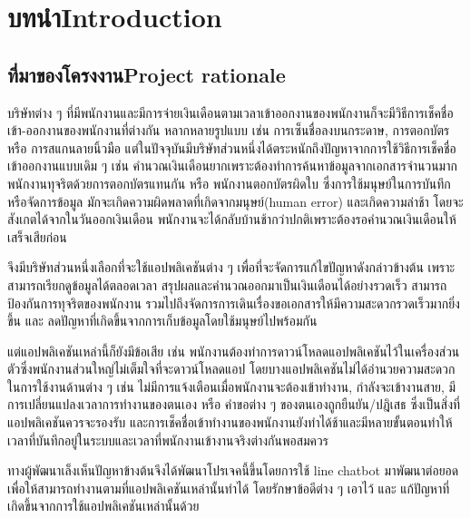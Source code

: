\chapter{\ifcpe บทนำ\else Introduction\fi}

\section{\ifcpe ที่มาของโครงงาน\else Project rationale\fi}
บริษัทต่าง ๆ ที่มีพนักงานและมีการจ่ายเงินเดือนตามเวลาเข้าออกงานของพนักงานก็จะมีวิธีการเช็คชื่อเข้า-ออกงานของพนักงานที่ต่างกัน 
หลากหลายรูปแบบ เช่น การเซ็นชื่อลงบนกระดาษ, การตอกบัตร หรือ การสแกนลายนิ้วมือ
แต่ในปัจจุบันมีบริษัทส่วนหนึ่งได้ตระหนักถึงปัญหาจากการใช้วิธีการเช็คชื่อเข้าออกงานแบบเดิม ๆ 
เช่น คำนวณเงินเดือนยากเพราะต้องทำการค้นหาข้อมูลจากเอกสารจำนวนมาก 
พนักงานทุจริตด้วยการตอกบัตรแทนกัน 
หรือ พนักงานตอกบัตรผิดใบ 
ซึ่งการใช้มนุษย์ในการบันทึกหรือจัดการข้อมูล มักจะเกิดความผิดพลาดที่เกิดจากมนุษย์(human error) 
และเกิดความล่าช้า โดยจะสังเกตได้จากในวันออกเงินเดือน พนักงานจะได้กลับบ้านช้ากว่าปกติเพราะต้องรอคำนวณเงินเดือนให้เสร็จเสียก่อน

จึงมีบริษัทส่วนหนึ่งเลือกที่จะใช้แอปพลิเคชันต่าง ๆ เพื่อที่จะจัดการแก้ไขปัญหาดังกล่าวข้างต้น 
เพราะสามารถเรียกดูข้อมูลได้ตลอดเวลา 
สรุปผลและคำนวณออกมาเป็นเงินเดือนได้อย่างรวดเร็ว 
สามารถป้องกันการทุจริตของพนักงาน 
รวมไปถึงจัดการการเดินเรื่องขอเอกสารให้มีความสะดวกรวดเร็วมากยิ่งขึ้น และ ลดปัญหาที่เกิดขึ้นจากการเก็บข้อมูลโดยใช้มนุษย์ไปพร้อมกัน

แต่แอปพลิเคชันเหล่านี้ก็ยังมีข้อเสีย เช่น 
พนักงานต้องทำการดาวน์โหลดแอปพลิเคชันไว้ในเครื่องส่วนตัวซึ่งพนักงานส่วนใหญ่ไม่เต็มใจที่จะดาวน์โหลดแอป โดยบางแอปพลิเคชันไม่ได้อำนวยความสะดวกในการใช้งานด้านต่าง ๆ เช่น
ไม่มีการแจ้งเตือนเมื่อพนักงานจะต้องเข้าทำงาน, กำลังจะเข้างานสาย, มีการเปลี่ยนแปลงเวลาการทำงานของตนเอง หรือ คำขอต่าง ๆ ของตนเองถูกยืนยัน/ปฎิเสธ
ซึ่งเป็นสิ่งที่แอปพลิเคชันควรจะรองรับ 
และการเช็คชื่อเข้าทำงานของพนักงานยังทำได้ช้าและมีหลายขั้นตอนทำให้เวลาที่บันทึกอยู่ในระบบและเวลาที่พนักงานเข้างานจริงต่างกันพอสมควร

ทางผู้พัฒนาเล็งเห็นปัญหาข้างต้นจึงได้พัฒนาโปรเจคนี้ขึ้นโดยการใช้ line chatbot มาพัฒนาต่อยอด
เพื่อให้สามารถทำงานตามที่แอปพลิเคชันเหล่านั้นทำได้
โดยรักษาข้อดีต่าง ๆ เอาไว้ และ แก้ปัญหาที่เกิดขึ้นจากการใช้แอปพลิเคชันเหล่านั้นด้วย


